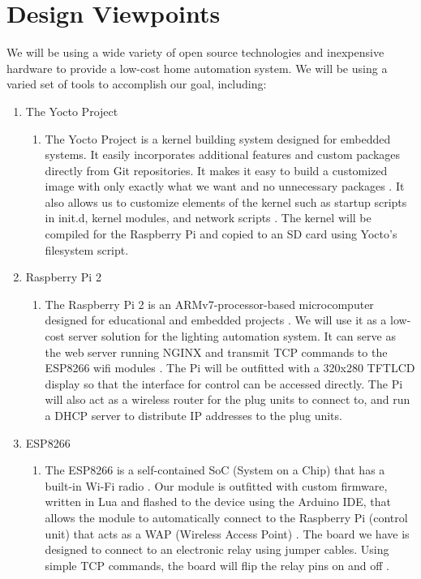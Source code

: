 \documentclass[oneside,openright]{book}
\begin{document}
\section{Design Viewpoints}

We will be using a wide variety of open source technologies and inexpensive
hardware to provide a low-cost home automation system. We will be using a
varied set of tools to accomplish our goal, including:

\begin{enumerate}
    \item The Yocto Project 
    \begin{enumerate}
        \item The Yocto Project is a kernel building system designed for
            embedded systems. It easily incorporates additional features and
            custom packages directly from Git repositories. It makes it easy to
            build a customized image with only exactly what we want and no
            unnecessary packages \cite{yocto}. It also allows us to customize elements of
            the kernel such as startup scripts in init.d, kernel modules, and
            network scripts \cite{flask}. The kernel will be compiled for the Raspberry Pi
            and copied to an SD card using Yocto's filesystem script.
    \end{enumerate} 
        \item Raspberry Pi 2
    \begin{enumerate}
        \item The Raspberry Pi 2 is an ARMv7-processor-based microcomputer
            designed for educational and embedded projects \cite{raspi}. We will use it as a
            low-cost server solution for the lighting automation system. It can
            serve as the web server running NGINX and transmit TCP commands to
            the ESP8266 wifi modules \cite{nginx}. The Pi will be outfitted with a 320x280
            TFTLCD display \cite{tftlcd} so that the interface for control can be
            accessed directly.  The Pi will also act as a wireless router for
            the plug units to connect to, and run a DHCP server to distribute
            IP addresses to the plug units.
    \end{enumerate} 
        \item ESP8266
    \begin{enumerate}
        \item The ESP8266 is a self-contained SoC (System on a Chip) that has a
            built-in Wi-Fi radio \cite{esp8266}. Our module is outfitted with custom firmware,
            written in Lua and flashed to the device using the Arduino IDE,
            that allows the module to automatically connect to the Raspberry Pi
            (control unit) that acts as a WAP (Wireless Access Point) \cite{lua}. The
            board we have is designed to connect to an electronic relay using
            jumper cables. Using simple TCP commands, the board will flip the
            relay pins on and off \cite{relay}.
    \end{enumerate}
\end{enumerate}
\end{document}
